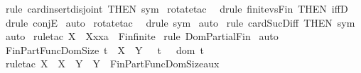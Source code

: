 \begin{isabellebody}
\isamarkupfalse%
\ {\isacharparenleft}rule\ card{\isacharunderscore}insert{\isacharunderscore}disjoint\ {\isacharbrackleft}THEN\ sym{\isacharbrackright}{\isacharparenright}\isanewline
{}\isamarkupfalse%
\ {\isacharparenleft}rotate{\isacharunderscore}tac\ {}{\isacharparenright}\isanewline
{}\isamarkupfalse%
\ {\isacharparenleft}drule\ finite{\isacharunderscore}vs{\isacharunderscore}Fin\ {\isacharbrackleft}THEN\ iffD{}{\isacharbrackright}{\isacharparenright}\isanewline
{}\isamarkupfalse%
\ {\isacharparenleft}drule\ conjE{\isacharparenright}\isanewline
{}\isamarkupfalse%
\ auto\isanewline
{}\isamarkupfalse%
\ {\isacharparenleft}rotate{\isacharunderscore}tac\ {}{\isacharparenright}\isanewline
{}\isamarkupfalse%
\ {\isacharparenleft}drule\ sym{\isacharparenright}\isanewline
{}\isamarkupfalse%
\ auto\isanewline
{}\isamarkupfalse%
\ {\isacharparenleft}rule\ card{\isacharunderscore}Suc{\isacharunderscore}Diff{}\ {\isacharbrackleft}THEN\ sym{\isacharbrackright}{\isacharparenright}\isanewline
{}\isamarkupfalse%
\ auto\isanewline
{}\isamarkupfalse%
\ {\isacharparenleft}rule{\isacharunderscore}tac\ X\ {\isacharequal}\ {\isachardoublequoteopen}X{\isacharpercent}xxa{\isachardoublequoteclose}\ \ Fin{\isacharunderscore}finite{\isacharparenright}\isanewline
{}\isamarkupfalse%
\ {\isacharparenleft}rule\ Dom{\isacharunderscore}Partial{\isacharunderscore}Fin{\isacharparenright}\isanewline
{}\isamarkupfalse%
\ auto\isanewline
{}\isamarkupfalse%
%
\endisatagproof
{\isafoldproof}%
%
\isadelimproof
\isanewline
%
\endisadelimproof
\isanewline
\ \isanewline
{}\isamarkupfalse%
\ Fin{\isacharunderscore}Part{\isacharunderscore}Func{\isacharunderscore}Dom{\isacharunderscore}Size{\isacharcolon}\ {\isachardoublequoteopen}t\ {\isacharcolon}\ {\isacharparenleft}X\ {\isacharminus}{\isacharbar}{\isacharbar}{\isacharminus}{\isachargreater}\ Y{\isacharparenright}\ {\isacharequal}{\isacharequal}{\isachargreater}\ {\isacharhash}\ t\ {\isacharequal}\ {\isacharhash}\ {\isacharparenleft}dom\ t{\isacharparenright}{\isachardoublequoteclose}\isanewline
%
\isadelimproof
%
\endisadelimproof
%
\isatagproof
{}\isamarkupfalse%
\ {\isacharparenleft}rule{\isacharunderscore}tac\ X\ {\isacharequal}\ {\isachardoublequoteopen}X{\isachardoublequoteclose}\ \ Y\ {\isacharequal}\ {\isachardoublequoteopen}Y{\isachardoublequoteclose}\ \ Fin{\isacharunderscore}Part{\isacharunderscore}Func{\isacharunderscore}Dom{\isacharunderscore}Size{\isacharunderscore}aux{\isacharparenright}\isanewline

\end{isabellebody}
